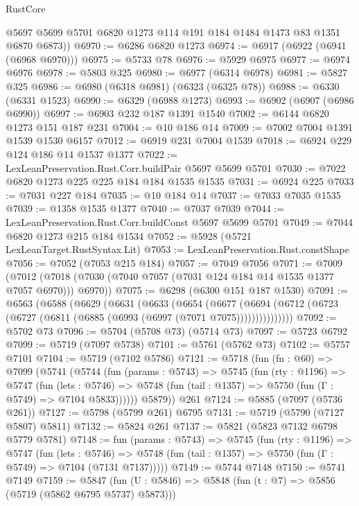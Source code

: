 \begin{lexlean}{RustCore}
\begin{coremodule}
{\begin{coremodule}
{{{{{{{{{{{{{{{{{{{{{{{{{{{{{{{{{{{{{{{{{{{{        @5697
        @5699
        @5701
        @6820
        @1273
        @114
        @191
        @184
        @1484
        @1473
        @83
        @1351
        @6870
        @6873))
@6970 := @6286 @6820 @1273
@6974 := @6917 (@6922 (@6941 (@6968 @6970)))
@6975 := @5733 @78
@6976 := @5929 @6975
@6977 := @6974 @6976
@6978 := @5803 @325
@6980 := @6977 (@6314 @6978)
@6981 := @5827 @325
@6986 := @6980 (@6318 @6981) (@6323 (@6325 @78))
@6988 := @6330 (@6331 @1523)
@6990 := @6329 (@6988 @1273)
@6993 := @6902 (@6907 (@6986 @6990))
@6997 := @6903 @232 @187 @1391 @1540
@7002 := @6144 @6820 @1273 @151 @187 @231
@7004 := @10 @186 @14
@7009 := @7002 @7004 @1391 @1539 @1530 @6157
@7012 := @6919 @231 @7004 @1539
@7018 := @6924 @229 @124 @186 @14 @1537 @1377
@7022 := LexLeanPreservation.Rust.Corr.buildPair @5697 @5699 @5701
@7030 := @7022 @6820 @1273 @225 @225 @184 @184 @1535 @1535
@7031 := @6924 @225
@7033 := @7031 @227 @184
@7035 := @10 @184 @14
@7037 := @7033 @7035 @1535
@7039 := @1358 @1535 @1377
@7040 := @7037 @7039
@7044 := LexLeanPreservation.Rust.Corr.buildConst @5697 @5699 @5701
@7049 := @7044 @6820 @1273 @215 @184 @1534
@7052 := @5928 (@5721 LexLeanTarget.RustSyntax.Lit)
@7053 := LexLeanPreservation.Rust.constShape
@7056 := @7052 (@7053 @215 @184)
@7057 := @7049 @7056
@7071 := @7009
    (@7012 (@7018 (@7030 (@7040 @7057 (@7031 @124 @184 @14 @1535 @1377 @7057 @6970))) @6970))
@7075 := @6298 (@6300 @151 @187 @1530)
@7091 := @6563
    (@6588
      (@6629
        (@6631
          (@6633
            (@6654
              (@6677
                (@6694 (@6712 (@6723 (@6727 (@6811 (@6885 (@6993 (@6997 (@7071 @7075)))))))))))))))
@7092 := @5702 @73
@7096 := @5704 (@5708 @73) (@5714 @73)
@7097 := @5723 @6792
@7099 := @5719 (@7097 @5738)
@7101 := @5761 (@5762 @73)
@7102 := @5757 @7101
@7104 := @5719 (@7102 @5786)
@7121 := @5718
    (fun (fn : @60) =>
    @7099
      (@5741
        (@5744
          (fun (params : @5743) =>
          @5745
            (fun (rty : @1196) =>
            @5747
              (fun (lets : @5746) =>
              @5748 (fun (tail : @1357) => @5750 (fun (Γ : @5749) => @7104 @5833))))))
        @5879))
    @261
@7124 := @5885 (@7097 (@5736 @261))
@7127 := @5798 (@5799 @261) @6795
@7131 := @5719 (@5790 (@7127 @5807) @5811)
@7132 := @5824 @261
@7137 := @5821 (@5823 @7132 @6798 @5779 @5781)
@7148 := fun (params : @5743) =>
  @5745
    (fun (rty : @1196) =>
    @5747
      (fun (lets : @5746) =>
      @5748 (fun (tail : @1357) => @5750 (fun (Γ : @5749) => @7104 (@7131 @7137)))))
@7149 := @5744 @7148
@7150 := @5741 @7149
@7159 := @5847 (fun (U : @5846) => @5848 (fun (t : @7) => @5856 (@5719 (@5862 @6795 @5737) @5873)))
}}}}}}}}}}}}}}}}}}}}}}}}}}}}}}}}}}}}}}}}}}}}
\end{coremodule}}
\end{coremodule}
\end{lexlean}
